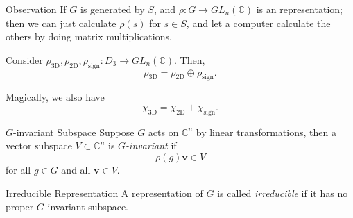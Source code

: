 
\begin{exmp}{Observation}{}
	If \(G\) is generated by \(S\), and \(\rho\colon G \to GL_n(\mathbb{C})\) is an representation; then we can just calculate \(\rho(s)\) for \(s \in S\), and let a computer calculate the others by doing matrix multiplications.
\end{exmp}

\begin{exmp}{}{}
	Consider \(\rho_\textrm{3D}, \rho_\textrm{2D}, \rho_\textrm{sign} \colon D_3 \to GL_n(\mathbb{C})\). Then, \[
		\rho_\textrm{3D} = \rho_\textrm{2D} \oplus \rho_\textrm{sign}.
	\] 

	Magically, we also have \[
		\chi_\textrm{3D} = \chi_\textrm{2D} + \chi_\textrm{sign}.
	\] 
\end{exmp}

\begin{defn}{\(G\)-invariant Subspace}{}
	Suppose \(G\) acts on \(\mathbb{C}^n\) by linear transformations, then a vector subspace \(V \subset \mathbb{C}^n\) is \emph{\(G\)-invariant} if \[
		\rho(g) \mathbf{v} \in V
	\] 
	for all \(g \in G\) and all \(\mathbf{v} \in V\).
\end{defn}

\begin{defn}{Irreducible Representation}{}
	A representation of \(G\) is called \emph{irreducible} if it has no proper \(G\)-invariant subspace.
\end{defn}

